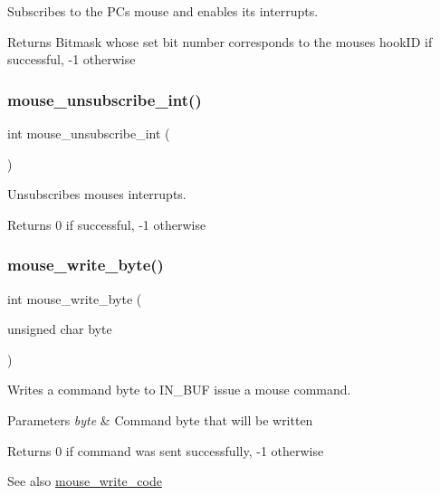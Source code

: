 Subscribes to the PC\textquotesingle{}s mouse and enables its interrupts. 

\begin{DoxyReturn}{Returns}
Bitmask whose set bit number corresponds to the mouse\textquotesingle{}s hook\+ID if successful, -\/1 otherwise 
\end{DoxyReturn}
\hypertarget{group__mouse_ga685ad2706aca36d9869a30a19b9f446a}{}\label{group__mouse_ga685ad2706aca36d9869a30a19b9f446a} 
\subsubsection{\texorpdfstring{mouse\+\_\+unsubscribe\+\_\+int()}{mouse\_unsubscribe\_int()}}
{\footnotesize\ttfamily int mouse\+\_\+unsubscribe\+\_\+int (\begin{DoxyParamCaption}{ }\end{DoxyParamCaption})}



Unsubscribes mouse\textquotesingle{}s interrupts. 

\begin{DoxyReturn}{Returns}
0 if successful, -\/1 otherwise 
\end{DoxyReturn}
\hypertarget{group__mouse_gae4dd0dac34bd9ca58faf21a9f181a00d}{}\label{group__mouse_gae4dd0dac34bd9ca58faf21a9f181a00d} 
\subsubsection{\texorpdfstring{mouse\+\_\+write\+\_\+byte()}{mouse\_write\_byte()}}
{\footnotesize\ttfamily int mouse\+\_\+write\+\_\+byte (\begin{DoxyParamCaption}\item[{unsigned char}]{byte }\end{DoxyParamCaption})}



Writes a command byte to I\+N\+\_\+\+B\+UF issue a mouse command. 


\begin{DoxyParams}{Parameters}
{\em byte} & Command byte that will be written \\
\hline
\end{DoxyParams}
\begin{DoxyReturn}{Returns}
0 if command was sent successfully, -\/1 otherwise 
\end{DoxyReturn}
\begin{DoxySeeAlso}{See also}
\hyperlink{group__mouse_ga43b4571e0c6a80c0a0b65c75ee72762e}{mouse\+\_\+write\+\_\+code} 
\end{DoxySeeAlso}
\hypertarget{group__mouse_ga43b4571e0c6a80c0a0b65c75ee72762e}{}\label{group__mouse_ga43b4571e0c6a80c0a0b65c75ee72762e} 
